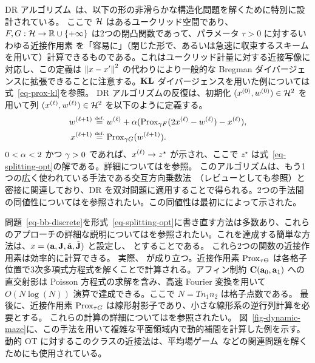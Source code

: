 DR アルゴリズム~\citep{Lions-Mercier-DR}は、以下の形の非滑らかな構造化問題を解くために特別に設計されている。
ここで $\Hh$ はあるユークリッド空間であり、$F, G : \Hh \rightarrow \RR \cup \{+\infty\}$ は2つの閉凸関数であって、パラメータ $\tau>0$ に対するいわゆる近接作用素
を「容易に」（\eg 閉じた形で、あるいは急速に収束するスキームを用いて）計算できるものである。これはユークリッド計量に対する近接写像に対応し、この定義は $\norm{x-x'}^2$ の代わりにより一般的な Bregman ダイバージェンスに拡張できることに注意する。$\KLD$ ダイバージェンスを用いた例については式~\eqref{eq-prox-kl}を参照。
DR アルゴリズムの反復は、初期化 $(x^{(0)}, w^{(0)})\in \Hh^2$ を用いて列 $(\it{x}, \it{w}) \in \Hh^2$ を以下のように定義する。
\begin{equation}\label{eq-dr-iters}
\begin{aligned}
	\itt{w} &\eqdef  \it{w} + \al (\Prox_{\ga F} (2\it{x}-\it{w})-\it{x}),\\
	\itt{x} &\eqdef  \Prox_{\ga G}(\itt{w}).
\end{aligned}
\end{equation}
$0 < \al < 2$ かつ $\ga > 0$ であれば、$\it{x} \rightarrow z^\star$ が示され、ここで $z^\star$ は式~\eqref{eq-splitting-opt}の解である。詳細については\citep{Combettes2007}を参照。
このアルゴリズムは、もう1つの広く使われている手法である交互方向乗数法~\citep{GabayMercier,GlowinskiMarroco}（レビューとして\citep{BoydADMM}も参照）と密接に関連しており、DR を双対問題に適用することで得られる。2つの手法間の同値性については\citep{FPapPeyOud13}を参照されたい。この同値性は最初に\citep{Eckstein1992}によって示された。

問題~\eqref{eq-bb-discrete}を形式~\eqref{eq-splitting-opt}に書き直す方法は多数あり、これらのアプローチの詳細な説明については\citep{FPapPeyOud13}を参照されたい。これを達成する簡単な方法は、$x=(\a,\MomentD,\tilde\a,\tilde\MomentD)$ と設定し、
とすることである。
これら2つの関数の近接作用素は効率的に計算できる。
実際、
が成り立つ。近接作用素 $\Prox_{\tau\Theta}$ は各格子位置で3次多項式方程式を解くことで計算される。アフィン制約 $\BBConstrD(\a_0,\a_1)$ への直交射影は Poisson 方程式の求解を含み、高速 Fourier 変換を用いて $O(N\log(N))$ 演算で達成できる。ここで $N=Tn_1 n_2$ は格子点数である。
最後に、近接作用素 $\Prox_{\tau G}$ は線形射影子であり、小さな線形系の逆行列計算を必要とする。
これらの計算の詳細については\citet{FPapPeyOud13}を参照されたい。
図~\ref{fig-dynamic-maze}に、この手法を用いて複雑な平面領域内で動的補間を計算した例を示す。
動的 OT に対するこのクラスの近接法は、平均場ゲーム~\citep{benamou2015augmented}などの関連問題を解くためにも使用されている。

